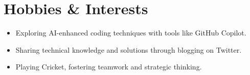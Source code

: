 \documentclass[letterpaper,11pt]{article}
\newcommand{\resumeItem}[1]{
  \item\small{
    {#1 \vspace{-2pt}}
  }
}
\newcommand{\resumeSubHeadingListStart}{\begin{itemize}[leftmargin=0.15in, label={}]}
\newcommand{\resumeSubHeadingListEnd}{\end{itemize}}
\begin{document}
\section{Hobbies \& Interests}
    \resumeSubHeadingListStart
        \resumeItem{Exploring AI-enhanced coding techniques with tools like GitHub Copilot.}
        \resumeItem{Sharing technical knowledge and solutions through blogging on Twitter.}
        \resumeItem{Playing Cricket, fostering teamwork and strategic thinking.}
    \resumeSubHeadingListEnd

\end{document}
